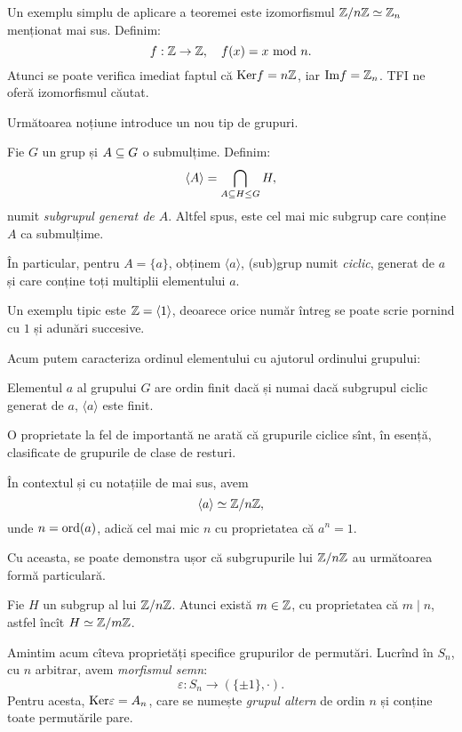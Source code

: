Un exemplu simplu de aplicare a teoremei este izomorfismul $ \mathbb{Z}/n\mathbb{Z} \simeq \mathbb{Z}_n $
menționat mai sus. Definim:
\[
  f : \mathbb{Z} \to \mathbb{Z}, \quad f(x) = x \text{ mod } n.
\]
Atunci se poate verifica imediat faptul că $ \mathrm{Ker}f = n\mathbb{Z} $, iar
$ \mathrm{Im}f = \mathbb{Z}_n $. TFI ne oferă izomorfismul căutat.

Următoarea noțiune introduce un nou tip de grupuri.

\begin{definition}\label{def:subgr-gen} 
  Fie $ G $ un grup și $ A \subseteq G $ o submulțime. Definim:
  \[
    \langle A \rangle = \bigcap_{A \subseteq H \leq G} H,
  \]
  numit \emph{subgrupul generat de $ A $}. Altfel spus, este cel mai mic
  subgrup care conține $ A $ ca submulțime.

  În particular, pentru $ A = \{ a \} $, obținem $ \langle a \rangle $,
  (sub)grup numit \emph{ciclic}, generat de $ a $ și care conține toți
  multiplii elementului $ a $.
\end{definition}

Un exemplu tipic este $ \mathbb{Z} = \langle 1 \rangle $, deoarece orice număr întreg
se poate scrie pornind cu $ 1 $ și adunări succesive.

Acum putem caracteriza ordinul elementului cu ajutorul ordinului grupului:
\begin{proposition}\label{pr:ord-fin}
  Elementul $ a $ al grupului $ G $ are ordin finit dacă și numai dacă
  subgrupul ciclic generat de $ a $, $ \langle a \rangle $ este finit.
\end{proposition}

O proprietate la fel de importantă ne arată că grupurile ciclice sînt, în
esență, clasificate de grupurile de clase de resturi.

\begin{theorem}\label{thm:ciclic-zn}
  În contextul și cu notațiile de mai sus, avem
  \[
    \langle a \rangle \simeq \mathbb{Z}/n\mathbb{Z},
  \]
  unde $ n = \mathrm{ord}(a) $, adică cel mai mic $ n $ cu proprietatea
  că $ a^n = 1 $.
\end{theorem}

Cu aceasta, se poate demonstra ușor că subgrupurile lui $ \mathbb{Z}/n\mathbb{Z} $ au
următoarea formă particulară.

\begin{theorem}\label{thm:subgr-zn}
  Fie $ H $ un subgrup al lui $ \mathbb{Z}/n\mathbb{Z} $. Atunci există $ m \in \mathbb{Z} $,
  cu proprietatea că $ m \mid n $, astfel încît $ H \simeq \mathbb{Z}/m\mathbb{Z} $.
\end{theorem}
 
Amintim acum cîteva proprietăți specifice grupurilor de permutări.
Lucrînd în $ S_n $, cu $ n $ arbitrar, avem \emph{morfismul semn}:
\[
  \varepsilon : S_n \to (\{ \pm 1 \}, \cdot).
\]
Pentru acesta, $ \mathrm{Ker}\varepsilon = A_n $, care se numește
\emph{grupul altern} de ordin $ n $ și conține toate permutările pare.


